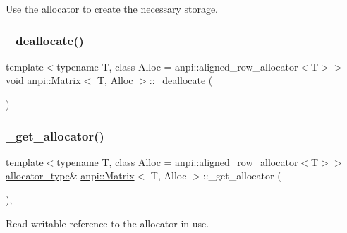 Use the allocator to create the necessary storage. 

\mbox{\label{classanpi_1_1Matrix_abdb7fc545cefe3fb0efc62b2bfbd7ac2}} 
\subsubsection{\texorpdfstring{\+\_\+deallocate()}{\_deallocate()}}
{\footnotesize\ttfamily template$<$typename T, class Alloc = anpi\+::aligned\+\_\+row\+\_\+allocator$<$\+T$>$$>$ \\
void \hyperlink{classanpi_1_1Matrix}{anpi\+::\+Matrix}$<$ T, Alloc $>$\+::\+\_\+deallocate (\begin{DoxyParamCaption}{ }\end{DoxyParamCaption})\hspace{0.3cm}{\ttfamily [private]}}

\mbox{\label{classanpi_1_1Matrix_a8bd792b99ec2206cfcb8a6ff6a7e9219}} 
\subsubsection{\texorpdfstring{\+\_\+get\+\_\+allocator()}{\_get\_allocator()}\hspace{0.1cm}{\footnotesize\ttfamily [1/2]}}
{\footnotesize\ttfamily template$<$typename T, class Alloc = anpi\+::aligned\+\_\+row\+\_\+allocator$<$\+T$>$$>$ \\
\hyperlink{classanpi_1_1Matrix_a3574b7528e3ddfb2f7cdf446be8286c1}{allocator\+\_\+type}\& \hyperlink{classanpi_1_1Matrix}{anpi\+::\+Matrix}$<$ T, Alloc $>$\+::\+\_\+get\+\_\+allocator (\begin{DoxyParamCaption}{ }\end{DoxyParamCaption})\hspace{0.3cm}{\ttfamily [private]}, {\ttfamily [noexcept]}}



Read-\/writable reference to the allocator in use. 

\mbox{\label{classanpi_1_1Matrix_a49856d0af9e0fd8e47bedb487bedce7e}} 
